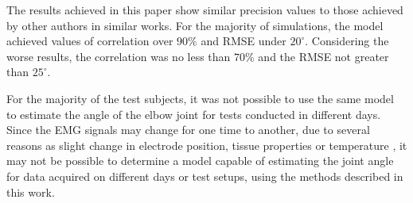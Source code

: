 \documentclass[letterpaper, 10 pt, conference]{ieeeconf}  %
\begin{document}
The results achieved in this paper show similar precision values to those achieved by other authors in similar works. For the majority of simulations, the model achieved values of correlation over $90\%$ and RMSE under $20^\circ$. Considering the worse results, the correlation was no less than $70\%$ and the RMSE not greater than $25^\circ$.





For the majority of the test subjects, it was not possible to use the same model to estimate the angle of the elbow joint for tests conducted in different days. Since the EMG signals may change for one time to another, due to several reasons as slight change in electrode position, tissue properties or temperature \cite{soderberg1975}, it may not be possible to determine a model capable of estimating the joint angle for data acquired on different days or test setups, using the methods described in this work.

\addtolength{\textheight}{-4.5cm}   %
\end{document}
